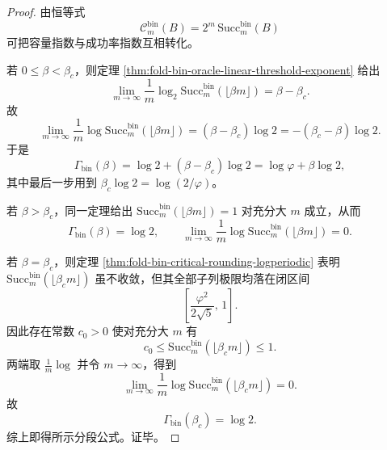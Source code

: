 \begin{proof}
由恒等式
\[
\mathcal C_m^{\mathrm{bin}}(B)=2^m\,\mathrm{Succ}^{\mathrm{bin}}_m(B)
\]
可把容量指数与成功率指数互相转化。

若 \(0\le \beta<\beta_c\)，则定理 \ref{thm:fold-bin-oracle-linear-threshold-exponent} 给出
\[
\lim_{m\to\infty}\frac1m\log_2 \mathrm{Succ}^{\mathrm{bin}}_m(\lfloor \beta m\rfloor)
=
\beta-\beta_c.
\]
故
\[
\lim_{m\to\infty}\frac1m\log \mathrm{Succ}^{\mathrm{bin}}_m(\lfloor \beta m\rfloor)
=
(\beta-\beta_c)\log 2
=
-(\beta_c-\beta)\log 2.
\]
于是
\[
\Gamma_{\mathrm{bin}}(\beta)
=
\log 2+(\beta-\beta_c)\log 2
=
\log\varphi+\beta\log 2,
\]
其中最后一步用到 \(\beta_c\log 2=\log(2/\varphi)\)。

若 \(\beta>\beta_c\)，同一定理给出
\(
\mathrm{Succ}^{\mathrm{bin}}_m(\lfloor \beta m\rfloor)=1
\)
对充分大 \(m\) 成立，从而
\[
\Gamma_{\mathrm{bin}}(\beta)=\log 2,
\qquad
\lim_{m\to\infty}\frac1m\log \mathrm{Succ}^{\mathrm{bin}}_m(\lfloor \beta m\rfloor)=0.
\]

若 \(\beta=\beta_c\)，则定理 \ref{thm:fold-bin-critical-rounding-logperiodic} 表明
\(
\mathrm{Succ}^{\mathrm{bin}}_m(\lfloor \beta_c m\rfloor)
\)
虽不收敛，但其全部子列极限均落在闭区间
\[
\left[\frac{\varphi^2}{2\sqrt5},\,1\right].
\]
因此存在常数 \(c_0>0\) 使对充分大 \(m\) 有
\[
c_0\le \mathrm{Succ}^{\mathrm{bin}}_m(\lfloor \beta_c m\rfloor)\le 1.
\]
两端取 \(\frac1m\log\) 并令 \(m\to\infty\)，得到
\[
\lim_{m\to\infty}\frac1m\log \mathrm{Succ}^{\mathrm{bin}}_m(\lfloor \beta_c m\rfloor)=0.
\]
故
\[
\Gamma_{\mathrm{bin}}(\beta_c)=\log 2.
\]
综上即得所示分段公式。证毕。
\end{proof}


